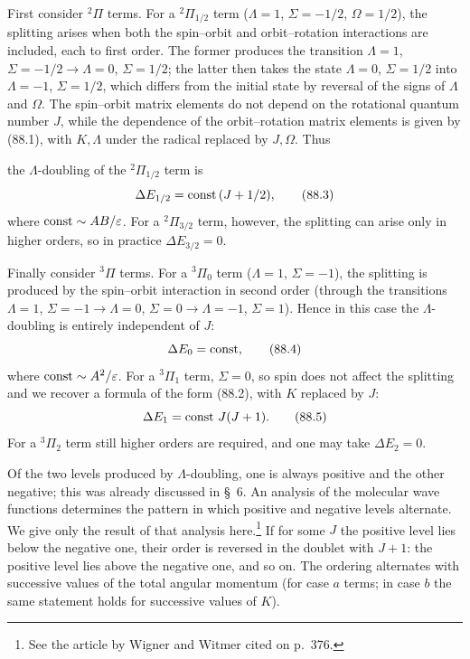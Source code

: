 First consider ${}^2\Pi$ terms. For a ${}^2\Pi_{1/2}$ term ($\Lambda=1$, $\Sigma=-1/2$, $\Omega=1/2$), the splitting arises when both the spin--orbit and orbit--rotation interactions are included, each to first order. The former produces the transition $\Lambda=1$, $\Sigma=-1/2\to\Lambda=0$, $\Sigma=1/2$; the latter then takes the state $\Lambda=0$, $\Sigma=1/2$ into $\Lambda=-1$, $\Sigma=1/2$, which differs from the initial state by reversal of the signs of $\Lambda$ and $\Omega$. The spin--orbit matrix elements do not depend on the rotational quantum number $J$, while the dependence of the orbit--rotation matrix elements is given by (88.1), with $K,\Lambda$ under the radical replaced by $J,\Omega$. Thus

the $\Lambda$-doubling of the ${}^2\Pi_{1/2}$ term is
\begin{equation}
\Delta E_{1/2}=\mathop{\rm const}\nolimits\,(J+1/2),
\tag{88.3}
\end{equation}
where $\mathop{\rm const}\nolimits\sim AB/\varepsilon$. For a ${}^2\Pi_{3/2}$ term, however, the splitting can arise only in higher orders, so in practice $\Delta E_{3/2}=0$.

Finally consider ${}^3\Pi$ terms. For a ${}^3\Pi_0$ term ($\Lambda=1$, $\Sigma=-1$), the splitting is produced by the spin--orbit interaction in second order (through the transitions $\Lambda=1$, $\Sigma=-1\to\Lambda=0$, $\Sigma=0\to\Lambda=-1$, $\Sigma=1$). Hence in this case the $\Lambda$-doubling is entirely independent of $J$:
\begin{equation}
\Delta E_0=\mathop{\rm const}\nolimits,
\tag{88.4}
\end{equation}
where $\mathop{\rm const}\nolimits\sim A^2/\varepsilon$. For a ${}^3\Pi_1$ term, $\Sigma=0$, so spin does not affect the splitting and we recover a formula of the form (88.2), with $K$ replaced by $J$:
\begin{equation}
\Delta E_1=\mathop{\rm const}\nolimits\,J(J+1).
\tag{88.5}
\end{equation}
For a ${}^3\Pi_2$ term still higher orders are required, and one may take $\Delta E_2=0$.

Of the two levels produced by $\Lambda$-doubling, one is always positive and the other negative; this was already discussed in \S~6. An analysis of the molecular wave functions determines the pattern in which positive and negative levels alternate. We give only the result of that analysis here.\footnote{See the article by Wigner and Witmer cited on p.~376.} If for some $J$ the positive level lies below the negative one, their order is reversed in the doublet with $J+1$: the positive level lies above the negative one, and so on. The ordering alternates with successive values of the total angular momentum (for case $a$ terms; in case $b$ the same statement holds for successive values of $K$).

